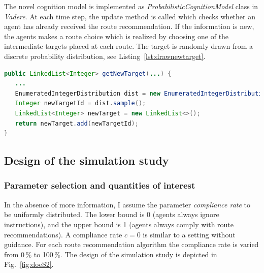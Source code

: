 The novel cognition model is implemented as \textit{ProbabilisticCognitionModel} class in  \textit{Vadere}. At each time step, the update method is called which checks whether an agent has already received the route recommendation. If the information is new, the agents makes a route choice which is realized by choosing one of the intermediate targets placed at each route. The target is randomly drawn from a discrete probability distribution, see Listing~\ref{lst:drawnewtarget}.  

%

\begin{lstlisting}[caption={getNewTarget() method of the novel ProbabilisticCognitionModel. Route choice is realized by drawing from a random distribution. The discrete distributions in dependency of the compliance rate are depicted in Fig.~\ref{fig:distsforparameter}. },language=java,label=lst:drawnewtarget]
public LinkedList<Integer> getNewTarget(...) {
   ...
   EnumeratedIntegerDistribution dist = new EnumeratedIntegerDistribution(..., targetIds, probabilities);
   Integer newTargetId = dist.sample();
   LinkedList<Integer> newTarget = new LinkedList<>();
   return newTarget.add(newTargetId);
}
\end{lstlisting}






\subsection{Design of the simulation study}



\subsubsection{Parameter selection and quantities of interest}


In the absence of more information, I assume the parameter \textit{compliance rate} to be uniformly distributed. The lower bound is 0 (agents always ignore instructions), and the upper bound is 1 (agents always comply with route recommendations). A compliance rate $c=0$ is similar to a setting without guidance. For each route recommendation algorithm the compliance rate is varied from 0\,\% to 100\,\%. The design of the simulation study is depicted in Fig.~\ref{fig:doeS2}. 

